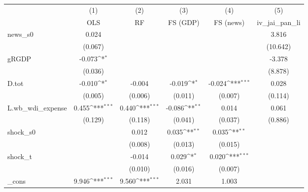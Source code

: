 {
\def\sym#1{\ifmmode^{#1}\else\(^{#1}\)\fi}
\begin{tabular}{l*{5}{c}}
\toprule
            &\multicolumn{1}{c}{(1)}&\multicolumn{1}{c}{(2)}&\multicolumn{1}{c}{(3)}&\multicolumn{1}{c}{(4)}&\multicolumn{1}{c}{(5)}\\
            &\multicolumn{1}{c}{OLS}&\multicolumn{1}{c}{RF}&\multicolumn{1}{c}{FS (GDP)}&\multicolumn{1}{c}{FS (news)}&\multicolumn{1}{c}{iv\_jai\_pan\_li}\\
\midrule
news\_s0     &       0.024         &                     &                     &                     &       3.816         \\
            &     (0.067)         &                     &                     &                     &    (10.642)         \\
\addlinespace
gRGDP       &      -0.073\sym{*}  &                     &                     &                     &      -3.378         \\
            &     (0.036)         &                     &                     &                     &     (8.878)         \\
\addlinespace
D.tot       &      -0.010\sym{*}  &      -0.004         &      -0.019\sym{*}  &      -0.024\sym{***}&       0.028         \\
            &     (0.005)         &     (0.006)         &     (0.011)         &     (0.007)         &     (0.114)         \\
\addlinespace
L.wb\_wdi\_expense&       0.455\sym{***}&       0.440\sym{***}&      -0.086\sym{**} &       0.014         &       0.061         \\
            &     (0.129)         &     (0.118)         &     (0.041)         &     (0.037)         &     (0.886)         \\
\addlinespace
shock\_s0    &                     &       0.012         &       0.035\sym{**} &       0.035\sym{**} &                     \\
            &                     &     (0.008)         &     (0.013)         &     (0.015)         &                     \\
\addlinespace
shock\_t     &                     &      -0.014         &       0.029\sym{*}  &       0.020\sym{***}&                     \\
            &                     &     (0.010)         &     (0.016)         &     (0.007)         &                     \\
\addlinespace
\_cons      &       9.946\sym{***}&       9.560\sym{***}&       2.031         &       1.003         &                     \\

\end{tabular}}
